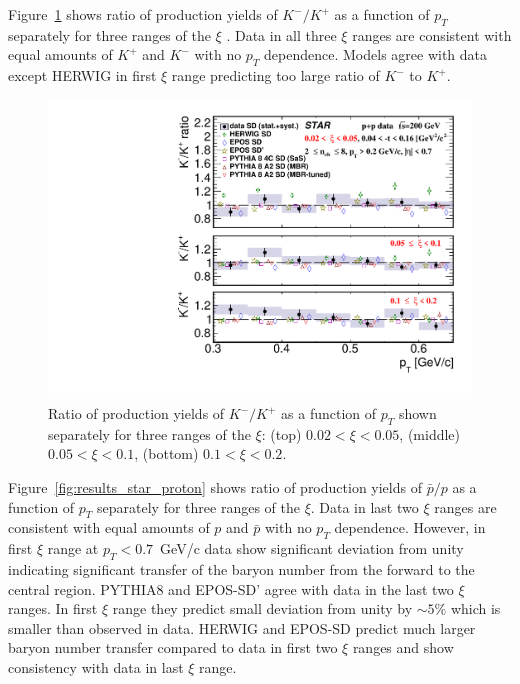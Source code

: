 Figure~\ref{fig:results_star_kaon} shows ratio of production yields of $K^- / K^+$ as a function of $p_T$  separately for three ranges of the $\xi$ . Data in all three $\xi$  ranges are consistent with equal amounts of $K^+$ and $K^-$ with no $p_T$ dependence. Models agree with data except HERWIG in first $\xi$  range predicting too large ratio of $K^-$ to $K^+$.
\begin{figure}[h!]
	\centering
	\includegraphics[width=.99\textwidth,page=1]{chapters/chrgSTAR/img/results/particleRatio_prt_1.pdf}
	\caption[Ratio of production yields of $K^-/K^+$ as a function of $p_T$ shown separately for three ranges of the $\xi$.]{Ratio of production yields of $K^-/K^+$ as a function of $p_T$ shown separately for three ranges of the $\xi$: (top) $0.02<\xi<0.05$, (middle) $0.05<\xi<0.1$, (bottom) $0.1<\xi<0.2$.}
	\label{fig:results_star_kaon}
	
\end{figure}
Figure~\ref{fig:results_star_proton} shows ratio of production yields of $\bar{p}/p$ as a function of $p_T$  separately for three ranges of the $\xi$. Data in last two $\xi$ ranges are consistent with equal amounts of $p$ and $\bar{p}$ with no $p_T$ dependence. However, in first $\xi$ range at $p_T<0.7$~GeV/c data show significant deviation from unity indicating significant transfer of the baryon number from the forward to the central region. PYTHIA8 and EPOS-SD' agree with data in the last two $\xi$ ranges. In first $\xi$ range they predict small deviation from unity by $\sim5\%$ which is smaller than observed in data. HERWIG and EPOS-SD predict much larger baryon number transfer compared to data in first two $\xi$ ranges and show consistency with data in last $\xi$ range.

